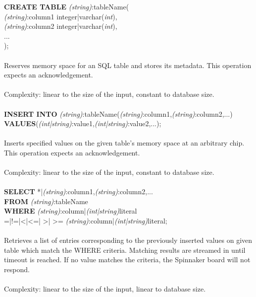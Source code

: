  \newpage
\noindent 
  {\large\textbf{CREATE TABLE} \textit{(string)}:tableName(\\
  	\textit{(string)}:column1 integer|varchar(\textit{int}),\\
  	\textit{(string)}:column2 integer|varchar(\textit{int}),\\
  	...\\
  	);}\\\\
\noindent
  Reserves memory space for an SQL table and stores its metadata. This operation expects an acknowledgement.\\\\
   Complexity: linear to the size of the input, constant to database size.\\\\
 \noindent
  {\large\textbf{INSERT INTO} \textit{(string)}:tableName(\textit{(string)}:column1,\textit{(string)}:column2,...)\\
  \textbf{VALUES}(\textit{(int|string)}:value1,\textit{(int|string)}:value2,...);}\\\\
\noindent
  Inserts specified values on the given table's memory space at an arbitrary chip. This operation expects an acknowledgement.\\\\
\noindent
   Complexity: linear to the size of the input, constant to database size.\\\\
\noindent
  {\large\textbf{SELECT} *|\textit{(string)}:column1,\textit{(string)}:column2,...\\
  \textbf{FROM} \textit{(string)}:tableName\\
  \textbf{WHERE} \textit{(string)}:column|\textit{(int|string)}literal \\=|!=|\textless |\textless =|
  \textgreater | \textgreater = \textit{(string)}:column|\textit{(int|string)}literal;}\\\\
\noindent
  Retrieves a list of entries corresponding to the previously inserted values on given table which match the WHERE criteria. Matching results are streamed in until timeout is reached. If no value matches the criteria, the Spinnaker board will not respond.\\\\
\noindent
Complexity: linear to the size of the input, linear to database size.\\\\
  

